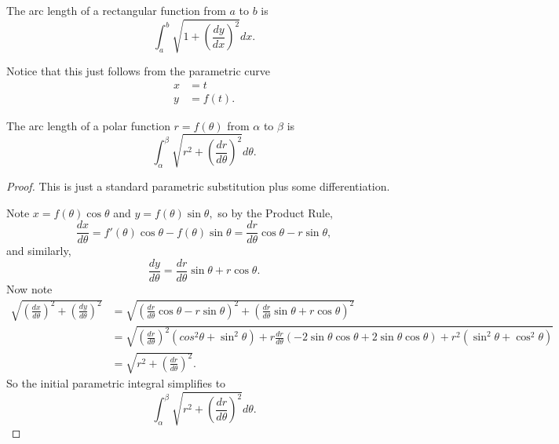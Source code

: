 \documentclass[blue,onecol]{shooting}
\begin{document}
\begin{center}
\end{center}

\begin{theo}
The arc length of a rectangular function from $a$ to $b$ is
\[\int_a^b \sqrt{1+\left(\frac{dy}{dx}\right)^2}dx.\]
\end{theo}

Notice that this just follows from the parametric curve
\begin{align*}
x&=t \\
y&=f(t).
\end{align*}

\begin{theo}
The arc length of a polar function $r=f(\theta)$ from $\alpha$ to $\beta$ is
\[\int_{\alpha}^{\beta}\sqrt{r^2+\left(\frac{dr}{d\theta}\right)^2}d\theta.\]
\end{theo}

\begin{proof}
This is just a standard parametric substitution plus some differentiation.

Note $x=f(\theta)\cos\theta$ and $y=f(\theta)\sin\theta,$ so by the Product Rule,
\[\frac{dx}{d\theta}=f'(\theta)\cos\theta-f(\theta)\sin\theta=\frac{dr}{d\theta}\cos\theta-r\sin\theta,\]
and similarly,
\[\frac{dy}{d\theta}=\frac{dr}{d\theta}\sin\theta+r\cos\theta.\]
Now note
\begin{align*}
\sqrt{\left(\frac{dx}{d\theta}\right)^2+\left(\frac{dy}{d\theta}\right)^2}&=\sqrt{\left(\frac{dr}{d\theta}\cos\theta-r\sin\theta\right)^2+\left(\frac{dr}{d\theta}\sin\theta+r\cos\theta\right)^2} \\
&=\sqrt{\left(\frac{dr}{d\theta}\right)^2(cos^2\theta+\sin^2\theta)+r\frac{dr}{d\theta}(-2\sin\theta\cos\theta+2\sin\theta\cos\theta)+r^2(\sin^2\theta+\cos^2\theta)} \\
&=\sqrt{r^2+\left(\frac{dr}{d\theta}\right)^2}.
\end{align*}
So the initial parametric integral simplifies to
\[\int_{\alpha}^{\beta}\sqrt{r^2+\left(\frac{dr}{d\theta}\right)^2}d\theta.\]
\end{proof}
\end{document}
